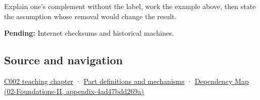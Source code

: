Explain one's complement without the label, work the example above, then state the assumption whose removal would change the result.

\textbf{Pending:} Internet checksums and historical machines.

\subsection{Source and navigation}\label{appendix-03c678cd40b3-source-and-navigation}

\hyperref[01-foundations-i-ch001-arithmetic-becomes-a-policy]{C002 teaching chapter} · \hyperref[appendix-fd090d982a15]{Part definitions and mechanisms} · \href{../02-Foundations-II/main.pdf\#nameddest=appendix-4ad47bdd269a}{Dependency Map (02-Foundations-II, appendix-4ad47bdd269a)}
